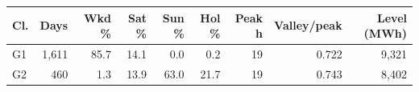 \begin{tabular}{@{}lrrrrrrrr@{}}
\toprule
Cl. & Days & Wkd \% & Sat \% & Sun \% & Hol \% & Peak h & Valley/peak & Level (MWh) \\
\midrule
G1 & 1{,}611 & 85.7 & 14.1 & 0.0 & 0.2 & 19 & 0.722 & 9{,}321 \\
G2 & 460 & 1.3 & 13.9 & 63.0 & 21.7 & 19 & 0.743 & 8{,}402 \\
\bottomrule
\end{tabular}
